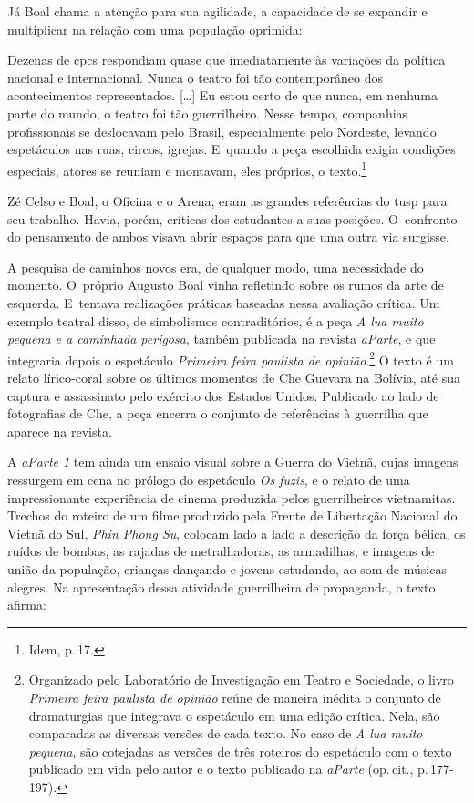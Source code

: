 Já Boal chama a atenção para sua agilidade, a capacidade de se expandir e multiplicar na
relação com uma população oprimida:

\startblockquote
Dezenas de {\sc cpc}s respondiam quase que imediatamente às variações da
política nacional e internacional. Nunca o teatro foi tão contemporâneo
dos acontecimentos representados. {[}\ldots{]} Eu estou certo de que nunca,
em nenhuma parte do mundo, o teatro foi tão guerrilheiro. Nesse tempo,
companhias profissionais se deslocavam pelo Brasil, especialmente pelo
Nordeste, levando espetáculos nas ruas, circos, igrejas. E~quando a peça
escolhida exigia condições especiais, atores se reuniam e montavam, eles
próprios, o texto.\footnote{Idem, p.\,17.}
\stopblockquote

Zé Celso e Boal, o Oficina e o Arena, eram as grandes referências do
{\sc tusp} para seu trabalho. Havia, porém, críticas dos estudantes a suas
posições. O~confronto do pensamento de ambos visava abrir espaços para
que uma outra via surgisse.

A pesquisa de caminhos novos era, de qualquer modo, uma necessidade do
momento. O~próprio Augusto Boal vinha refletindo sobre os rumos da arte
de esquerda. E~tentava realizações práticas baseadas nessa avaliação
crítica. Um exemplo teatral disso, de simbolismos contraditórios, é a
peça {\it A lua muito pequena e a caminhada perigosa}, também publicada
na revista {\it aParte}, e que integraria depois o espetáculo
{\it Primeira feira paulista de opinião}.\footnote{Organizado
  pelo Laboratório de Investigação em Teatro e Sociedade, o livro {\it Primeira feira paulista de opinião} reúne de maneira inédita o conjunto de dramaturgias que integrava o espetáculo em
  uma edição crítica. Nela, são comparadas as diversas versões de cada
  texto. No caso de {\it A lua muito pequena}, são cotejadas as versões
  de três roteiros do espetáculo com o texto publicado em vida pelo
  autor e o texto publicado na {\it aParte} (op.\,cit., p.\,177-197).} O texto é um relato lírico-coral sobre os
últimos momentos de Che Guevara na Bolívia, até sua captura e
assassinato pelo exército dos Estados Unidos. Publicado ao lado de
fotografias de Che, a peça encerra o conjunto de referências à guerrilha
que aparece na revista.

A {\it aParte 1} tem ainda um ensaio visual sobre a Guerra do Vietnã,
cujas imagens ressurgem em cena no prólogo do espetáculo {\it Os fuzis},
e o relato de uma impressionante experiência de cinema produzida pelos
guerrilheiros vietnamitas. Trechos do roteiro de um filme produzido pela
Frente de Libertação Nacional do Vietnã do Sul, {\it Phin Phong Su},
colocam lado a lado a descrição da força bélica, os ruídos de bombas, as
rajadas de metralhadoras, as armadilhas, e imagens de união da
população, crianças dançando e jovens estudando, ao som de músicas
alegres. Na apresentação dessa atividade guerrilheira de propaganda, o
texto afirma:


